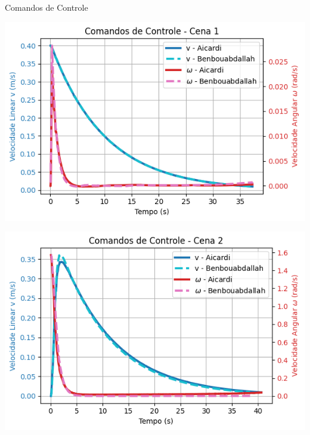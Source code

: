 \documentclass{beamer}
\begin{document}
\begin{frame}{Comandos de Controle}
\begin{minipage}{0.48\linewidth}
    \centering
    \includegraphics[width=\linewidth]{Figuras/Controle_Cena_1.png}
  \end{minipage}
  \hfill
  \begin{minipage}{0.48\linewidth}
    \centering
    \includegraphics[width=\linewidth]{Figuras/Controle_Cena_2.png}
  \end{minipage}
\end{frame}
\end{document}
